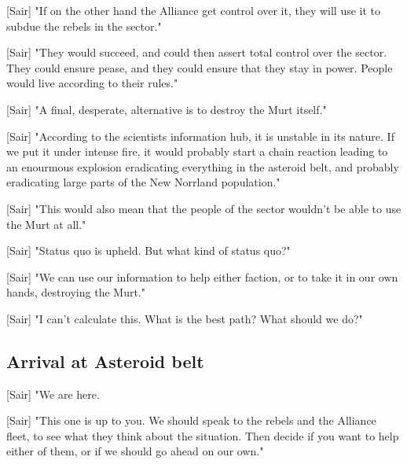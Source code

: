 \documentclass[a4paper,12pt]{article}
\begin{document}
[Sair] "If on the other hand the Alliance get control over it, they will use it to subdue the rebels in the sector."

[Sair] "They would succeed, and could then assert total control over the sector. They could ensure pease, and they
could ensure that they stay in power. People would live according to their rules."

[Sair] "A final, desperate, alternative is to destroy the Murt itself."

[Sair] "According to the scientists information hub, it is unstable in its nature. If we put it under intense fire, it would
probably start a chain reaction leading to an enourmous explosion eradicating everything in the asteroid belt, and probably
eradicating large parts of the New Norrland population."

[Sair] "This would also mean that the people of the sector wouldn't be able to use the Murt at all."

[Sair] "Status quo is upheld. But what kind of status quo?"

[Sair] "We can use our information to help either faction, or to take it in our own hands, destroying the Murt."

[Sair] "I can't calculate this. What is the best path? What should we do?"


\subsection{Arrival at Asteroid belt}

[Sair] "We are here. 

[Sair] "This one is up to you. We should speak to the rebels and the Alliance fleet, to see what they think about the
situation. Then decide if you want to help either of them, or if we should go ahead on our own."
\end{document}
